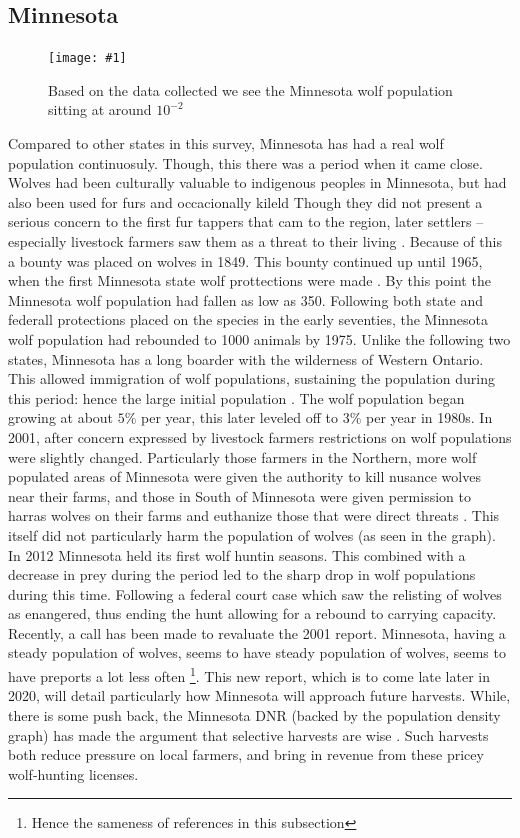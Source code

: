 \documentclass[12pt]{article}
\newcommand{\rimage}[2]{
\begin{figure}
    \begin{center}
\texttt{[image: \#1]}
\caption{#2}
    \end{center}
\end{figure}
}
\begin{document}
\subsection{Minnesota}
\rimage{minnesota.png}{Based on the data collected we see the Minnesota wolf population sitting at around $10^{-2}$}
Compared to other states in this survey, Minnesota has had a real wolf population continuosuly. 
Though, this there was a period when it came close. 
Wolves had been culturally valuable to indigenous peoples in Minnesota,
    but had also been used for furs and occacionally kileld \cite{2001ManageMN}
Though they did not present a serious concern to the first fur tappers that cam to the region,
    later settlers -- especially livestock farmers saw them as a threat to their living \cite{2001ManageMN}.
Because of this a bounty was placed on wolves in 1849.
This bounty continued up until 1965, when the first Minnesota state wolf prottections were made  \cite{2001ManageMN}.
By this point the Minnesota wolf population had fallen as low as 350.
Following both state and federall protections placed on the species in the early seventies,
    the Minnesota wolf population had rebounded to 1000 animals by 1975.
Unlike the following two states, 
Minnesota has a long boarder with the wilderness of Western Ontario.
This allowed immigration of wolf populations, sustaining the population during this period:
hence the large initial population \cite{2001ManageMN}.
The wolf population began growing at about $5\%$ per year,
this later leveled off to $3\%$ per year in 1980s.
In 2001, after concern expressed by livestock farmers restrictions on wolf populations were slightly changed.
Particularly those farmers in the Northern, more wolf populated areas of Minnesota were given the authority to kill nusance wolves near their farms,
and those in South of Minnesota were given permission to harras wolves on their farms and euthanize those that were direct threats \cite{2001ManageMN}.
This itself did not particularly harm the population of wolves (as seen in the graph).
In 2012 Minnesota held its first wolf huntin seasons. 
This combined with a decrease in prey during the period led to the sharp drop in wolf populations during this time.
Following a federal court case which saw the relisting of wolves as enangered,
thus ending the hunt allowing for a rebound to carrying capacity. 
Recently, a call has been made to revaluate the 2001 report.
Minnesota, having a steady population of wolves, seems to have steady population of wolves,
seems to have preports a lot less often \footnote{Hence the sameness of references in this subsection}.
This new report, which is to come late later in 2020, will detail particularly how Minnesota will approach future harvests.
While,
there is some push back,
the Minnesota DNR (backed by the population density graph) has made the argument that selective harvests are wise \cite{2019StarTribune}.
Such harvests both reduce pressure on local farmers, and bring in revenue from these pricey wolf-hunting licenses.
\end{document}
